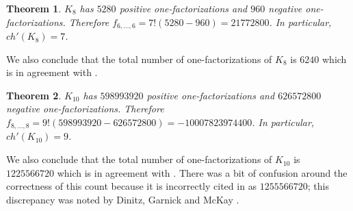 \documentclass[12pt]{article}
\theoremstyle{plain}
\newtheorem{thm}{Theorem}[section]
\theoremstyle{definition}
\theoremstyle{remark}
\begin{document}
\begin{thm}
$K_8$ has $5280$ positive one-factorizations and $960$ negative one-factorizations.  Therefore $f_{6,\ldots, 6} = 7!(5280 - 960) = 21772800$.  In particular, $ch'(K_8) = 7$.
\end{thm}

We also conclude that the total number of one-factorizations of $K_{8}$ is $6240$ which is in agreement with \cite{DicksonSafford}.

\begin{thm}
$K_{10}$ has $598993920$ positive one-factorizations and $626572800$ negative one-factorizations.  Therefore $f_{8,\ldots, 8} = 9!(598993920 - 626572800) = -10007823974400$.  In particular, $ch'(K_{10}) = 9$.
\end{thm}

We also conclude that the total number of one-factorizations of $K_{10}$ is $1225566720$ which is in agreement with \cite{gelling19741}.  There was a bit of confusion around the correctness of this count because it is incorrectly cited in \cite{wallis} as $1255566720$; this discrepancy was noted by Dinitz, Garnick and McKay \cite{dinitz1994there}.



\end{document}

